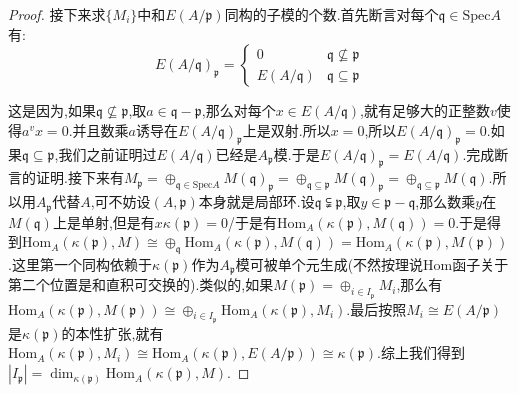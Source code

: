 \begin{enumerate}
\begin{proof}
    	\qquad
    	
    	接下来求$\{M_i\}$中和$E(A/\mathfrak{p})$同构的子模的个数.首先断言对每个$\mathfrak{q}\in\mathrm{Spec}A$有:
    	$$E(A/\mathfrak{q})_{\mathfrak{p}}=\left\{\begin{array}{cc}0&\mathfrak{q}\not\subseteq\mathfrak{p}\\E(A/\mathfrak{q})&\mathfrak{q}\subseteq\mathfrak{p}\end{array}\right.$$
    	
    	这是因为,如果$\mathfrak{q}\not\subseteq\mathfrak{p}$,取$a\in\mathfrak{q}-\mathfrak{p}$,那么对每个$x\in E(A/\mathfrak{q})$,就有足够大的正整数$v$使得$a^vx=0$.并且数乘$a$诱导在$E(A/\mathfrak{q})_{\mathfrak{p}}$上是双射.所以$x=0$,所以$E(A/\mathfrak{q})_{\mathfrak{p}}=0$.如果$\mathfrak{q}\subseteq\mathfrak{p}$,我们之前证明过$E(A/\mathfrak{q})$已经是$A_{\mathfrak{p}}$模.于是$E(A/\mathfrak{q})_{\mathfrak{p}}=E(A/\mathfrak{q})$.完成断言的证明.接下来有$M_{\mathfrak{p}}=\oplus_{\mathfrak{q}\in\mathrm{Spec}A}M(\mathfrak{q})_{\mathfrak{p}}=\oplus_{\mathfrak{q}\subseteq\mathfrak{p}}M(\mathfrak{q})_{\mathfrak{p}}=\oplus_{\mathfrak{q}\subseteq\mathfrak{p}}M(\mathfrak{q})$.所以用$A_{\mathfrak{p}}$代替$A$,可不妨设$(A,\mathfrak{p})$本身就是局部环.设$\mathfrak{q}\subsetneqq\mathfrak{p}$,取$y\in\mathfrak{p}-\mathfrak{q}$,那么数乘$y$在$M(\mathfrak{q})$上是单射,但是有$x\kappa(\mathfrak{p})=0$/于是有$\mathrm{Hom}_A(\kappa(\mathfrak{p}),M(\mathfrak{q}))=0$.于是得到$\mathrm{Hom}_A(\kappa(\mathfrak{p}),M)\cong\oplus_{\mathfrak{q}}\mathrm{Hom}_A(\kappa(\mathfrak{p}),M(\mathfrak{q}))=\mathrm{Hom}_A(\kappa(\mathfrak{p}),M(\mathfrak{p}))$.这里第一个同构依赖于$\kappa(\mathfrak{p})$作为$A_{\mathfrak{p}}$模可被单个元生成(不然按理说$\mathrm{Hom}$函子关于第二个位置是和直积可交换的).类似的,如果$M(\mathfrak{p})=\oplus_{i\in I_{\mathfrak{p}}}M_i$,那么有$\mathrm{Hom}_A(\kappa(\mathfrak{p}),M(\mathfrak{p}))\cong\oplus_{i\in I_{\mathfrak{p}}}\mathrm{Hom}_A(\kappa(\mathfrak{p}),M_i)$.最后按照$M_i\cong E(A/\mathfrak{p})$是$\kappa(\mathfrak{p})$的本性扩张,就有$\mathrm{Hom}_A(\kappa(\mathfrak{p}),M_i)\cong\mathrm{Hom}_A(\kappa(\mathfrak{p}),E(A/\mathfrak{p}))\cong\kappa(\mathfrak{p})$.综上我们得到$|I_{\mathfrak{p}}|=\dim_{\kappa(\mathfrak{p})}\mathrm{Hom}_A(\kappa(\mathfrak{p}),M)$.
    \end{proof}
\end{enumerate}

